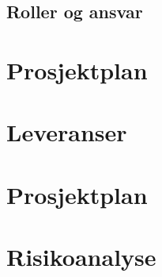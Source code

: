 \documentclass[norsk,a4paper,12pt]{article}
\begin{document}
\subsection{Roller og ansvar}

\section{Prosjektplan}

\section{Leveranser}

\section{Prosjektplan}

\section{Risikoanalyse}
\end{document}
